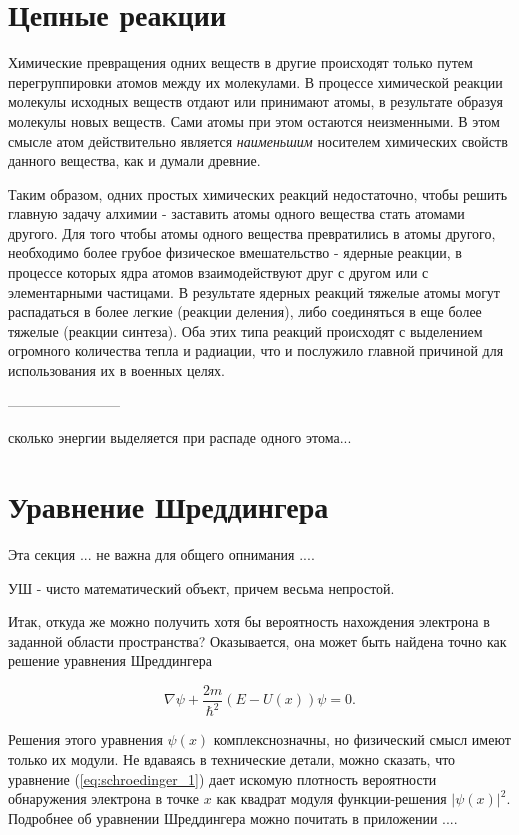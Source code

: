 \section*{Цепные реакции}

Химические превращения одних веществ в другие происходят только путем перегруппировки атомов между их молекулами.
В процессе химической реакции молекулы исходных веществ отдают или принимают атомы, в результате образуя молекулы новых веществ. 
Сами атомы при этом остаются неизменными.
В этом смысле атом действительно является \textit{наименьшим} носителем химических свойств данного вещества, как и думали древние.

Таким образом, одних простых химических реакций недостаточно, чтобы решить главную задачу алхимии - заставить атомы одного вещества стать атомами другого.
Для того чтобы атомы одного вещества превратились в атомы другого, необходимо более грубое физическое вмешательство - ядерные реакции, в процессе которых ядра атомов взаимодействуют друг с другом или с элементарными частицами.
В результате ядерных реакций тяжелые атомы могут распадаться в более легкие (реакции деления), либо соединяться в еще более тяжелые (реакции синтеза).
Оба этих типа реакций происходят с выделением огромного количества тепла и радиации, что и послужило главной причиной для использования их в военных целях.

------------------------

сколько энергии выделяется при распаде одного этома...


\section*{Уравнение Шреддингера}

Эта секция ... не важна для общего опнимания ....

УШ - чисто математический объект, причем весьма непростой.

Итак, откуда же можно получить хотя бы вероятность нахождения электрона в заданной области пространства?
Оказывается, она может быть найдена точно как решение уравнения Шреддингера

\begin{equation}\label{eq:schroedinger_1}
\nabla\psi + \frac{2m}{\hbar^2}(E - U(x))\psi = 0.
\end{equation}

Решения этого уравнения $\psi(x)$ комплекснозначны, но физический смысл имеют только их модули. 
Не вдаваясь в технические детали, можно сказать, что уравнение (\ref{eq:schroedinger_1}) дает искомую плотность вероятности обнаружения электрона в точке $x$ как квадрат модуля функции-решения $|\psi(x)|^2$.
Подробнее об уравнении Шреддингера можно почитать в приложении ....

